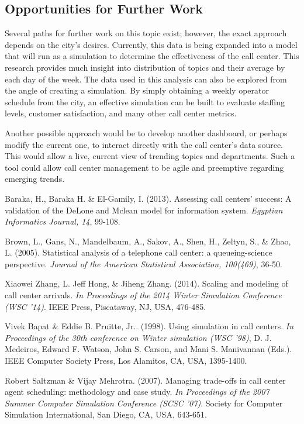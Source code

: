 \documentclass{article}
\begin{document}
	\subsection{Opportunities for Further Work}

Several paths for further work on this topic exist; however, the exact approach depends on the city's desires.  Currently, this data is being expanded into a model that will run as a simulation to determine the effectiveness of the call center.  This research provides much insight into distribution of topics and their average by each day of the week.  The data used in this analysis can also be explored from the angle of creating a simulation.  By simply obtaining a weekly operator schedule from the city, an effective simulation can be built to evaluate staffing levels, customer satisfaction, and many other call center metrics.
\par
Another possible approach would be to develop another dashboard, or perhaps modify the current one, to interact directly with the call center's data source.  This would allow a live, current view of trending topics and departments.  Such a tool could allow call center management to be agile and preemptive regarding emerging trends.



\begin{thebibliography}{5}

Baraka, H., Baraka H. \& El-Gamily, I. (2013). Assessing call centers' success: A validation of the DeLone and Mclean model for information system. \textit{Egyptian Informatics Journal, 14}, 99-108.

Brown, L., Gans, N., Mandelbaum, A., Sakov, A., Shen, H., Zeltyn, S., \& Zhao, L. (2005). Statistical analysis of a telephone call center: a queueing-science perspective. \textit{Journal of the American Statistical Association, 100(469)}, 36-50.

Xiaowei Zhang, L. Jeff Hong, \& Jiheng Zhang. (2014). Scaling and modeling of call center arrivals. \textit{In Proceedings of the 2014 Winter Simulation Conference (WSC '14)}. IEEE Press, Piscataway, NJ, USA, 476-485.

Vivek Bapat \& Eddie B. Pruitte, Jr.. (1998). Using simulation in call centers. \textit{In Proceedings of the 30th conference on Winter simulation (WSC '98)}, D. J. Medeiros, Edward F. Watson, John S. Carson, and Mani S. Manivannan (Eds.). IEEE Computer Society Press, Los Alamitos, CA, USA, 1395-1400.

Robert Saltzman \& Vijay Mehrotra. (2007). Managing trade-offs in call center agent scheduling: methodology and case study. \textit{In Proceedings of the 2007 Summer Computer Simulation Conference (SCSC '07)}. Society for Computer Simulation International, San Diego, CA, USA, 643-651.

\end{thebibliography}
\newpage
\end{document}
